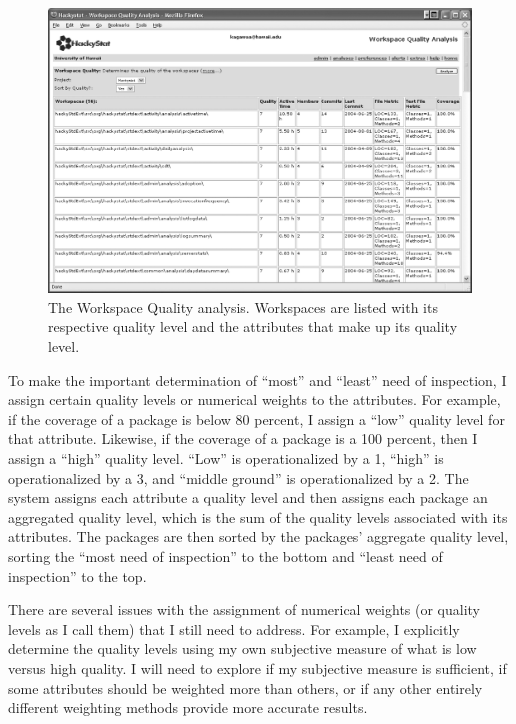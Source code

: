 \documentclass[11pt,twocolumn]{article}
\begin{document}
\begin{figure}[ht]
  \centering
  \includegraphics[width=1.00\textwidth]{WorkspaceQuality.eps}
  \caption{The Workspace Quality analysis. Workspaces are listed with its
  respective quality level and the attributes that make up its quality
  level.
}
  \label{fig:WorkspaceQualityAnalysis}
\end{figure}

To make the important determination of ``most'' and ``least'' need of
inspection, I assign certain quality levels or numerical weights to the
attributes. For example, if the coverage of a package is below 80 percent,
I assign a ``low'' quality level for that attribute. Likewise, if the
coverage of a package is a 100 percent, then I assign a ``high'' quality
level. ``Low'' is operationalized by a 1, ``high'' is operationalized by a
3, and ``middle ground'' is operationalized by a 2. The system assigns each
attribute a quality level and then assigns each package an aggregated
quality level, which is the sum of the quality levels associated with its
attributes. The packages are then sorted by the packages' aggregate quality
level, sorting the ``most need of inspection'' to the bottom and ``least need
of inspection'' to the top.

There are several issues with the assignment of numerical weights (or
quality levels as I call them) that I still need to address. For example, I
explicitly determine the quality levels using my own subjective measure of
what is low versus high quality. I will need to explore if my subjective
measure is sufficient, if some attributes should be weighted more than
others, or if any other entirely different weighting methods provide more
accurate results.
\end{document}
